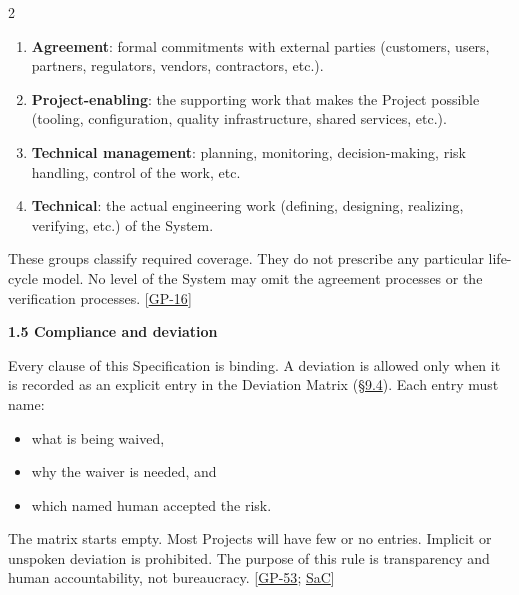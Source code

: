 \begin{multicols}{2}
\begin{enumerate}
\item \textbf{Agreement}: formal commitments with external parties (customers, users, partners, regulators, vendors, contractors, etc.).

\item \textbf{Project-enabling}: the supporting work that makes the Project possible (tooling, configuration, quality infrastructure, shared services, etc.).

\item \textbf{Technical management}: planning, monitoring, decision-making, risk handling, control of the work, etc.

\item \textbf{Technical}: the actual engineering work (defining, designing, realizing, verifying, etc.) of the System.

\end{enumerate}

These groups classify required coverage. They do not prescribe any particular life-cycle model. No level of the System may omit the agreement processes or the verification processes. [\hyperlink{gp-16}{GP-16}]

\hypertarget{nss-1.5}{}

\par\smallskip\noindent\textbf{1.5 Compliance and deviation}\par\nopagebreak

Every clause of this Specification is binding. A deviation is allowed only when it is recorded as an explicit entry in the Deviation Matrix (\hyperlink{nss-9.4}{\S9.4}). Each entry must name:

\begin{itemize}\setlength{\itemsep}{0pt}\setlength{\parskip}{0pt}

\item what is being waived,

\item why the waiver is needed, and

\item which named human accepted the risk.

\end{itemize}

The matrix starts empty. Most Projects will have few or no entries. Implicit or unspoken deviation is prohibited. The purpose of this rule is transparency and human accountability, not bureaucracy. [\hyperlink{gp-53}{GP-53}; \hyperlink{gp-SaC}{SaC}]

\hypertarget{nss-1.6}{}


\end{multicols}
